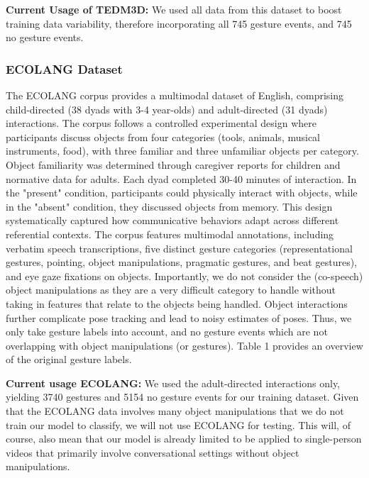 \documentclass[11pt,headings=small,cleardoublepage=empty,tocflat,numbers=noenddot,twoside,captions=tableheading]{scrbook}
\begin{document}
\begin{refsection}
\textbf{Current Usage of TEDM3D:} We used all data from this dataset to boost training data variability, therefore incorporating all 745 gesture events, and 745 no gesture events.

\subsubsection{ECOLANG Dataset}
The ECOLANG corpus provides a multimodal dataset of English, comprising child-directed (38 dyads with 3-4 year-olds) and adult-directed (31 dyads) interactions. The corpus follows a controlled experimental design where participants discuss objects from four categories (tools, animals, musical instruments, food), with three familiar and three unfamiliar objects per category. Object familiarity was determined through caregiver reports for children and normative data for adults. Each dyad completed 30-40 minutes of interaction. In the "present" condition, participants could physically interact with objects, while in the "absent" condition, they discussed objects from memory. This design systematically captured how communicative behaviors adapt across different referential contexts. The corpus features multimodal annotations, including verbatim speech transcriptions, five distinct gesture categories (representational gestures, pointing, object manipulations, pragmatic gestures, and beat gestures), and eye gaze fixations on objects. Importantly, we do not consider the (co-speech) object manipulations as they are a very difficult category to handle without taking in features that relate to the objects being handled. Object interactions further complicate pose tracking and lead to noisy estimates of poses. Thus, we only take gesture labels into account, and no gesture events which are not overlapping with object manipulations (or gestures). Table 1 provides an overview of the original gesture labels.

\textbf{Current usage ECOLANG:} We used the adult-directed interactions only, yielding 3740 gestures and 5154 no gesture events for our training dataset. Given that the ECOLANG data involves many object manipulations that we do not train our model to classify, we will not use ECOLANG for testing. This will, of course, also mean that our model is already limited to be applied to single-person videos that primarily involve conversational settings without object manipulations.  


\end{refsection}
\end{document}
